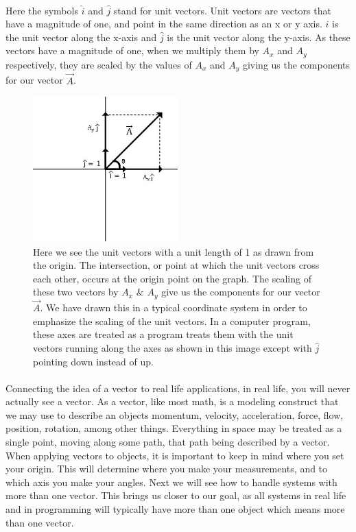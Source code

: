 \documentclass[12pt, letterpaper]{report}
\begin{document}
	\paragraph{} Here the symbols $\hat{i}$ and $\hat{j}$ stand for unit vectors. Unit vectors are vectors that have a magnitude of one, and point in the same direction as an x or y axis. $\hat{i}$ is the unit vector along the x-axis and $\hat{j}$ is the unit vector along the y-axis. As these vectors have a magnitude of one, when we multiply them by $A_x$ and $A_y$ respectively, they are scaled by the values of $A_x$ and $A_y$ giving us the components for our vector $\vec{A}$.
	\begin{figure}[ht]
	\centering
	\includegraphics[width=0.5\textwidth]{Processing Images/UnitVector/UnitVector.jpg}
	\caption{Here we see the unit vectors with a unit length of 1 as drawn from the origin. The intersection, or point at which the unit vectors cross each other, occurs at the origin point on the graph. The scaling of these two vectors by $A_x$ $\&$ $A_y$ give us the components for our vector $\vec{A}$. We have drawn this in a typical coordinate system in order to emphasize the scaling of the unit vectors. In a computer program, these axes are treated as a program treats them with the unit vectors running along the axes as shown in this image except with $\hat{j}$ pointing down instead of up.}
	\end{figure}
\newpage
	\paragraph{} Connecting the idea of a vector to real life applications, in real life, you will never actually see a vector. As a vector, like most math, is a modeling construct that we may use to describe an objects momentum, velocity, acceleration, force, flow, position, rotation, among other things. Everything in space may be treated as a single point, moving along some path, that path being described by a vector. When applying vectors to objects, it is important to keep in mind where you set your origin. This will determine where you make your measurements, and to which axis you make your angles. Next we will see how to handle systems with more than one vector. This brings us closer to our goal, as all systems in real life and in programming will typically have more than one object which means more than one vector.
\end{document}
